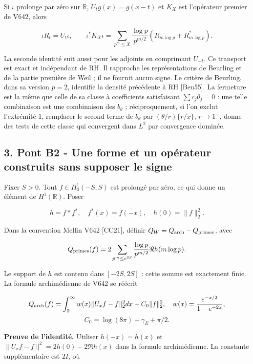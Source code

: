 \documentclass[
  10pt,
  a4paper,
]{article}
\begin{document}
Si \(\iota\) prolonge par zéro sur \(\mathbb R\), \(U_tg(x)=g(x-t)\) et
\(K_X\) est l'opérateur premier de V642, alors

\[
\iota R_t=U_t\iota,\qquad
\iota^*K_X\iota=\sum_{p^m\le X}\frac{\log p}{p^{m/2}}
(R_{m\log p}+R_{m\log p}^*).
\]

La seconde identité suit aussi pour les adjoints en comprimant
\(U_{-t}\). Ce transport est exact et indépendant de RH. Il rapproche
les représentations de Beurling et de la partie première de Weil ; il ne
fournit aucun signe. Le critère de Beurling, dans sa version \(p=2\),
identifie la densité précédente à RH {[}Beu55{]}. La fermeture est la
même que celle de sa classe à coefficients satisfaisant
\(\sum c_j\theta_j=0\) : une telle combinaison est une combinaison des
\(b_\theta\) ; réciproquement, si l'on exclut l'extrémité \(1\),
remplacer le second terme de \(b_\theta\) par \((\theta/r)\{r/x\}\),
\(r\to1^-\), donne des tests de cette classe qui convergent dans \(L^2\)
par convergence dominée.

\newpage

\hypertarget{pont-b2---une-forme-et-un-opuxe9rateur-construits-sans-supposer-le-signe}{%
\subsection{3. Pont B2 - Une forme et un opérateur construits sans
supposer le
signe}\label{pont-b2---une-forme-et-un-opuxe9rateur-construits-sans-supposer-le-signe}}

Fixer \(S>0\). Tout \(f\in H_0^1(-S,S)\) est prolongé par zéro, ce qui
donne un élément de \(H^1(\mathbb R)\). Poser

\[
h=f*f^*,\quad f^*(x)=\overline{f(-x)},\quad h(0)=\|f\|_2^2.
\]

Dans la convention Mellin V642 {[}CC21{]}, définir
\(Q_W=Q_{\rm arch}-Q_{\rm primes}\), avec

\[
Q_{\rm primes}(f)=2\sum_{p^m\le e^{2S}}\frac{\log p}{p^{m/2}}
\Re h(m\log p).
\]

Le support de \(h\) est contenu dans \([-2S,2S]\) : cette somme est
exactement finie. La formule archimédienne de V642 se réécrit

\[
Q_{\rm arch}(f)=\int_0^\infty w(x)\|U_xf-f\|_2^2dx-C_0\|f\|_2^2,
\quad w(x)=\frac{e^{-x/2}}{1-e^{-2x}},
\] \[
C_0=\log(8\pi)+\gamma_E+\pi/2.
\]

\textbf{Preuve de l'identité.} Utiliser \(h(-x)=\overline{h(x)}\) et
\(\|U_xf-f\|^2=2h(0)-2\Re h(x)\) dans la formule archimédienne. La
constante supplémentaire est \(2I\), où
\end{document}
